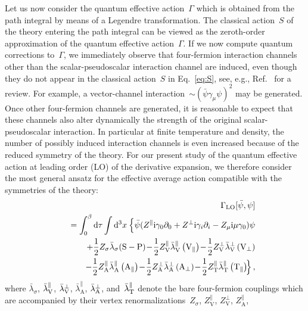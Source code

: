 \documentclass[prd,english,preprintnumbers,amsmath,amssymb,nofootinbib,twocolumn,superscriptaddress]{revtex4-1}
\newcommand{\I}{\mathrm{i}}
\newcommand{\be}{\begin{eqnarray}}
\newcommand{\ee}{\end{eqnarray}}
\newcommand{\del}{\partial}
\newcommand{\nn}{\nonumber }
\newcommand{\psib}{\bar{\psi}}
\begin{document}
{Let us now consider the quantum effective action~$\Gamma$ which is obtained from the path integral by
means of a Legendre transformation. The classical action~$S$ of the theory entering the path integral 
can be viewed as the zeroth-order approximation of the quantum effective
action~$\Gamma$. If we now compute quantum corrections to~$\Gamma$, we immediately observe that four-fermion
interaction channels other than the scalar-pseudoscalar interaction channel are induced, even though they do not appear in the classical
action~$S$ in Eq.~\eqref{eq:S}, see, e.g., Ref.~\cite{Braun:2011pp} for a review. For example, a vector-channel interaction~$\sim (\bar{\psi}\gamma_{\mu}\psi)^2$
may be generated. Once other
four-fermion channels are generated, it is reasonable to expect that these channels also alter dynamically 
the strength of the original scalar-pseudoscalar interaction.
In particular at finite temperature and density, the number of possibly induced interaction channels is even increased because of
the reduced symmetry of the theory.
For our present study of the quantum effective action at leading order (LO) of the derivative expansion, we therefore consider the most general 
ansatz for the effective average action compatible with the symmetries of the {theory:
%
\be
&& \Gamma_{\rm LO}[\psib, \psi] \nn\\
&& \quad = \int_0 ^\beta {\rm d} \tau  \int {\rm d}^3 x \: \Big\{ 
\psib ( Z^\parallel \I \gamma_0 \del_0 + Z^\perp \I \gamma_i \del_i - Z_\mu \I \mu \gamma_0 ) \psi\nn \\
&&\quad\;\; +\frac{1}{2} Z_{\sigma}\bar\lambda_\sigma (\text{S}-\text{P}) \!-\! \frac{1}{2}Z_{\text{V}}^{\parallel}\bar \lambda ^\parallel _\text V \left( \text{V}_{\parallel} \right)
\!-\!\frac{1}{2}  Z_{\text{V}}^{\perp}\bar\lambda ^\perp _\text V \left( \text{V}_{\perp} \right)\nn\\
&&\quad\quad -\frac{1}{2} Z_{\text{A}}^{\parallel}\bar{\lambda} ^\parallel _\text A \left( \text{A}_{\parallel} \right) \!-\! \frac{1}{2} Z_{\text{A}}^{\perp}
\bar{\lambda} ^\perp _\text A \left( \text{A}_{\perp} \right)
 \!-\! \frac{1}{2} Z_{\text{T}}^{\parallel}\bar \lambda_{\text T}^{\parallel} \left( \text{T}_{\parallel} \right)\!\!\Big\}\,,
\label{eq:gammagen}
\ee
%
where} $\bar{\lambda}_\sigma$, $\bar{\lambda}^\parallel _\text V$, $\bar{\lambda}^\perp _\text V$, $\bar{\lambda}_{\text{A}}^{\parallel}$, $\bar{\lambda}^\perp _\text A$, 
and~$\bar{\lambda}_{\text T}^{\parallel}$ denote the bare four-fermion couplings which are accompanied by 
their vertex renormalizations~$Z_{\sigma}$, $Z_{\text{V}}^{\parallel}$, $Z_{\text{V}}^{\perp}$, $Z_{\text{A}}^{\parallel}$, 
}
\end{document}
